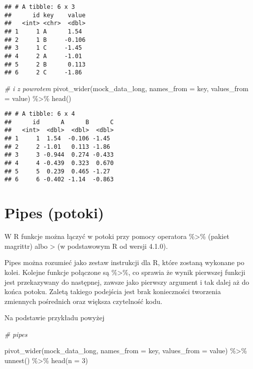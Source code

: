 \documentclass[
]{book}
\newenvironment{Shaded}{\begin{snugshade}}{\end{snugshade}}
\newcommand{\AttributeTok}[1]{\textcolor[rgb]{0.77,0.63,0.00}{#1}}
\newcommand{\CommentTok}[1]{\textcolor[rgb]{0.56,0.35,0.01}{\textit{#1}}}
\newcommand{\DecValTok}[1]{\textcolor[rgb]{0.00,0.00,0.81}{#1}}
\newcommand{\FunctionTok}[1]{\textcolor[rgb]{0.00,0.00,0.00}{#1}}
\newcommand{\NormalTok}[1]{#1}
\newcommand{\SpecialCharTok}[1]{\textcolor[rgb]{0.00,0.00,0.00}{#1}}
\begin{document}
\begin{verbatim}
## # A tibble: 6 x 3
##      id key    value
##   <int> <chr>  <dbl>
## 1     1 A      1.54 
## 2     1 B     -0.106
## 3     1 C     -1.45 
## 4     2 A     -1.01 
## 5     2 B      0.113
## 6     2 C     -1.86
\end{verbatim}

\begin{Shaded}
\begin{Highlighting}[]
\CommentTok{\# i z powrotem}
\FunctionTok{pivot\_wider}\NormalTok{(mock\_data\_long, }\AttributeTok{names\_from =}\NormalTok{ key, }\AttributeTok{values\_from =}\NormalTok{ value) }\SpecialCharTok{\%\textgreater{}\%} \FunctionTok{head}\NormalTok{()}
\end{Highlighting}
\end{Shaded}

\begin{verbatim}
## # A tibble: 6 x 4
##      id      A      B      C
##   <int>  <dbl>  <dbl>  <dbl>
## 1     1  1.54  -0.106 -1.45 
## 2     2 -1.01   0.113 -1.86 
## 3     3 -0.944  0.274 -0.433
## 4     4 -0.439  0.323  0.670
## 5     5  0.239  0.465 -1.27 
## 6     6 -0.402 -1.14  -0.863
\end{verbatim}

\hypertarget{pipes-potoki}{%
\section{Pipes (potoki)}\label{pipes-potoki}}

W R funkcje można łączyć w potoki przy pomocy operatora \%\textgreater\% (pakiet magrittr) albo \textbar\textgreater{} (w podstawowym R od wersji 4.1.0).

Pipes można rozumieć jako zestaw instrukcji dla R, które zostaną wykonane po kolei. Kolejne funkcje połączone są \%\textgreater\%, co sprawia że wynik pierwszej funkcji jest przekazywany do następnej, zawsze jako pierwszy argument i tak dalej aż do końca potoku. Zaletą takiego podejścia jest brak konieczności tworzenia zmiennych pośrednich oraz większa czytelność kodu.

Na podstawie przykładu powyżej

\begin{Shaded}
\begin{Highlighting}[]
\CommentTok{\# pipes}

\FunctionTok{pivot\_wider}\NormalTok{(mock\_data\_long, }\AttributeTok{names\_from =}\NormalTok{ key, }\AttributeTok{values\_from =}\NormalTok{ value) }\SpecialCharTok{\%\textgreater{}\%} \FunctionTok{unnest}\NormalTok{() }\SpecialCharTok{\%\textgreater{}\%} \FunctionTok{head}\NormalTok{(}\AttributeTok{n =} \DecValTok{3}\NormalTok{)}
\end{Highlighting}
\end{Shaded}
\end{document}
